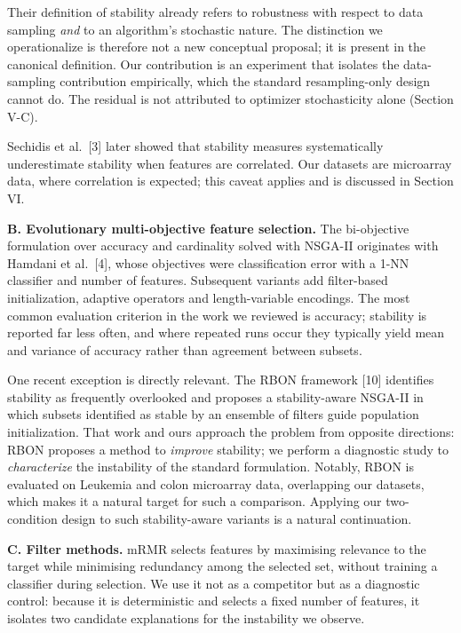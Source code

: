 \documentclass[conference]{IEEEtran}
\begin{document}
Their definition of stability already refers to robustness with respect to data sampling \emph{and} to an algorithm's stochastic nature. The distinction we operationalize is therefore not a new conceptual proposal; it is present in the canonical definition. Our contribution is an experiment that isolates the data-sampling contribution empirically, which the standard resampling-only design cannot do. The residual is not attributed to optimizer stochasticity alone (Section V-C).

Sechidis et al.~[3] later showed that stability measures systematically underestimate stability when features are correlated. Our datasets are microarray data, where correlation is expected; this caveat applies and is discussed in Section VI.

\textbf{B. Evolutionary multi-objective feature selection.} The bi-objective formulation over accuracy and cardinality solved with NSGA-II originates with Hamdani et al.~[4], whose objectives were classification error with a 1-NN classifier and number of features. Subsequent variants add filter-based initialization, adaptive operators and length-variable encodings. The most common evaluation criterion in the work we reviewed is accuracy; stability is reported far less often, and where repeated runs occur they typically yield mean and variance of accuracy rather than agreement between subsets.

One recent exception is directly relevant. The RBON framework [10] identifies stability as frequently overlooked and proposes a stability-aware NSGA-II in which subsets identified as stable by an ensemble of filters guide population initialization. That work and ours approach the problem from opposite directions: RBON proposes a method to \emph{improve} stability; we perform a diagnostic study to \emph{characterize} the instability of the standard formulation. Notably, RBON is evaluated on Leukemia and colon microarray data, overlapping our datasets, which makes it a natural target for such a comparison. Applying our two-condition design to such stability-aware variants is a natural continuation.

\textbf{C. Filter methods.} mRMR selects features by maximising relevance to the target while minimising redundancy among the selected set, without training a classifier during selection. We use it not as a competitor but as a diagnostic control: because it is deterministic and selects a fixed number of features, it isolates two candidate explanations for the instability we observe.
\end{document}
